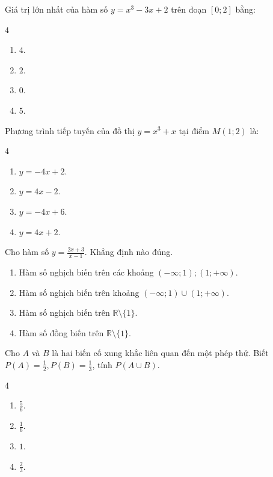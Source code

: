 \begin{baitap}%
	Giá trị lớn nhất của hàm số $y=x^3-3x+2$ trên đoạn $[0;2]$ bằng:
	\begin{multicols}{4}
		\begin{enumerate}[\quad \bf A.]
			\item $4$.
			\item $2$.
			\item $0$.
			\item $5$.
		\end{enumerate}
	\end{multicols}
\end{baitap}

\begin{baitap}%
	Phương trình tiếp tuyến của đồ thị $y=x^3+x$ tại điểm $M(1;2)$ là:
	\begin{multicols}{4}
		\begin{enumerate}[\quad \bf A.]
			\item $y=-4x+2$.
			\item $y=4x-2$.
			\item $y=-4x+6$.
			\item $y=4x+2$.
		\end{enumerate}
	\end{multicols}
\end{baitap}
\begin{baitap}%
	Cho hàm số $y=\frac{2x+3}{x-1}$. Khẳng định nào đúng.
	\begin{enumerate}[\quad \bf A.]
		\item Hàm số nghịch biến trên các khoảng $(-\infty;1); (1;+\infty)$.
		\item Hàm số nghịch biến trên khoảng $(-\infty;1) \cup (1;+\infty)$.
		\item Hàm số nghịch biến trên $\mathbb{R} \setminus \{1\}$.
		\item Hàm số đồng biến trên $\mathbb{R} \setminus \{1\}$.
	\end{enumerate}
\end{baitap}

\begin{baitap}%
	Cho $A$ và $B$ là hai biến cố xung khắc liên quan đến một phép thử. Biết $P(A)=\frac{1}{2}, P(B)=\frac{1}{3}$, tính $P(A \cup B)$.
	\begin{multicols}{4}
		\begin{enumerate}[\quad \bf A.]
			\item $\frac{5}{6}$.
			\item $\frac{1}{6}$.
			\item $1$.
			\item $\frac{2}{3}$.
		\end{enumerate}
	\end{multicols}
\end{baitap}

